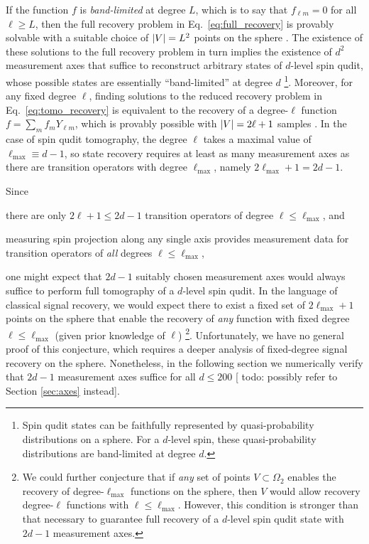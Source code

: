 \documentclass[notitlepage,twocolumn]{revtex4-2}
\renewcommand{\t}{\text} %
\newcommand{\red}[1]{{\color{red} #1}}
\begin{document}
If the function $f$ is {\it band-limited} at degree $L$, which is to say that $f_{\ell m}=0$ for all $\ell\ge L$, then the full recovery problem in Eq.~\eqref{eq:full_recovery} is provably solvable with a suitable choice of $\abs{V}=L^2$ points on the sphere \cite{freeden2008spherical, freeden2018spherical}.
The existence of these solutions to the full recovery problem in turn implies the existence of $d^2$ measurement axes that suffice to reconstruct arbitrary states of $d$-level spin qudit, whose possible states are essentially ``band-limited'' at degree $d$ \footnote{Spin qudit states can be faithfully represented by quasi-probability distributions on a sphere.  For a $d$-level spin, these quasi-probability distributions are band-limited at degree $d$.}.
Moreover, for any fixed degree $\ell$, finding solutions to the reduced recovery problem in Eq.~\eqref{eq:tomo_recovery} is equivalent to the recovery of a degree-$\ell$ function $f = \sum_m f_m Y_{\ell m}$, which is provably possible with $\abs{V}=2\ell+1$ samples \cite{freeden2008spherical}.
In the case of spin qudit tomography, the degree $\ell$ takes a maximal value of $\ell_{\t{max}}\equiv d-1$, so state recovery requires at least as many measurement axes as there are transition operators with degree $\ell_{\t{max}}$, namely $2\ell_{\t{max}}+1=2d-1$.

Since
\begin{enumerate*}
\item there are only $2\ell+1\le2d-1$ transition operators of degree $\ell\le\ell_{\t{max}}$, and
\item measuring spin projection along any single axis provides measurement data for transition operators of {\it all} degrees $\ell\le\ell_{\t{max}}$,
\end{enumerate*}
one might expect that $2d-1$ suitably chosen measurement axes would always suffice to perform full tomography of a $d$-level spin qudit.
In the language of classical signal recovery, we would expect there to exist a fixed set of $2\ell_{\t{max}}+1$ points on the sphere that enable the recovery of {\it any} function with fixed degree $\ell\le\ell_{\t{max}}$ (given prior knowledge of $\ell$) \footnote{We could further conjecture that if {\it any} set of points $V\subset\Omega_2$ enables the recovery of degree-$\ell_{\t{max}}$ functions on the sphere, then $V$ would allow recovery degree-$\ell$ functions with $\ell\le\ell_{\t{max}}$.  However, this condition is stronger than that necessary to guarantee full recovery of a $d$-level spin qudit state with $2d-1$ measurement axes.}.
Unfortunately, we have no general proof of this conjecture, which requires a deeper analysis of fixed-degree signal recovery on the sphere.
Nonetheless, in the following section we numerically verify that $2d-1$ measurement axes suffice for all $d\le200$ [\red{todo: possibly refer to Section \ref{sec:axes} instead}].
\end{document}
